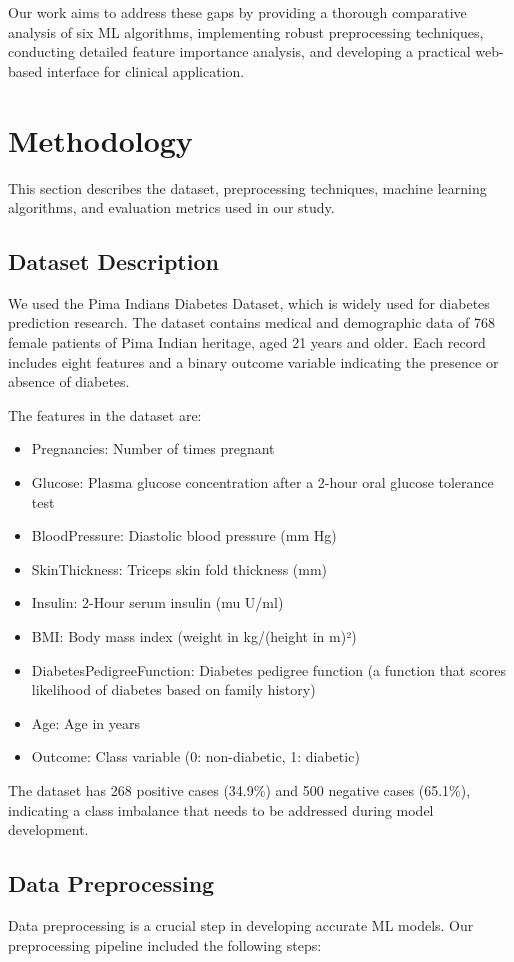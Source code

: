 \documentclass[conference]{IEEEtran}
\begin{document}
Our work aims to address these gaps by providing a thorough comparative analysis of six ML algorithms, implementing robust preprocessing techniques, conducting detailed feature importance analysis, and developing a practical web-based interface for clinical application.

\section{Methodology}
This section describes the dataset, preprocessing techniques, machine learning algorithms, and evaluation metrics used in our study.

\subsection{Dataset Description}
We used the Pima Indians Diabetes Dataset, which is widely used for diabetes prediction research. The dataset contains medical and demographic data of 768 female patients of Pima Indian heritage, aged 21 years and older. Each record includes eight features and a binary outcome variable indicating the presence or absence of diabetes.

The features in the dataset are:
\begin{itemize}
    \item Pregnancies: Number of times pregnant
    \item Glucose: Plasma glucose concentration after a 2-hour oral glucose tolerance test
    \item BloodPressure: Diastolic blood pressure (mm Hg)
    \item SkinThickness: Triceps skin fold thickness (mm)
    \item Insulin: 2-Hour serum insulin (mu U/ml)
    \item BMI: Body mass index (weight in kg/(height in m)²)
    \item DiabetesPedigreeFunction: Diabetes pedigree function (a function that scores likelihood of diabetes based on family history)
    \item Age: Age in years
    \item Outcome: Class variable (0: non-diabetic, 1: diabetic)
\end{itemize}

The dataset has 268 positive cases (34.9\%) and 500 negative cases (65.1\%), indicating a class imbalance that needs to be addressed during model development.

\subsection{Data Preprocessing}
Data preprocessing is a crucial step in developing accurate ML models. Our preprocessing pipeline included the following steps:
\end{document}
